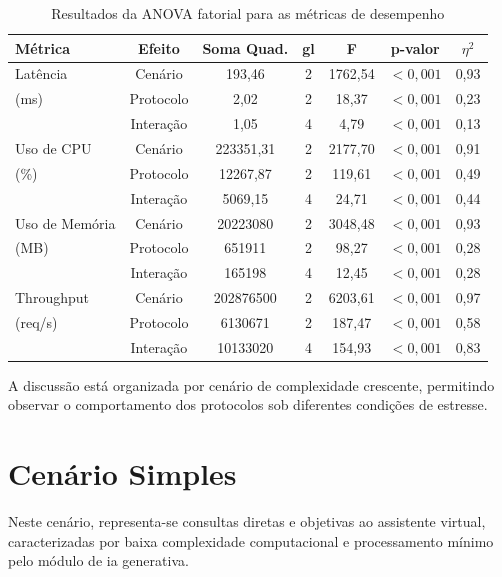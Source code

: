 \begin{table}[h]
\centering
\caption{Resultados da ANOVA fatorial para as métricas de desempenho}
\label{tab:5-resultados-anova}
\begin{tabular}{lcccccc}
\hline
\textbf{Métrica} & \textbf{Efeito} & \textbf{Soma Quad}. & \textbf{gl} & \textbf{F} & \textbf{p-valor} & \textbf{$\eta^2$} \\ 
\hline
Latência & Cenário & 193,46 & 2 & 1762,54 & $< 0,001$ & 0,93 \\
(ms) & Protocolo & 2,02 & 2 & 18,37 &$< 0,001$ & 0,23 \\
& Interação & 1,05 & 4 & 4,79 & $< 0,001$ & 0,13 \\
\hline
Uso de CPU & Cenário & 223351,31 & 2 & 2177,70 & $< 0,001$ & 0,91 \\
(\%) & Protocolo & 12267,87 & 2 & 119,61 & $< 0,001$ & 0,49 \\
& Interação & 5069,15 & 4 & 24,71 & $< 0,001$ & 0,44 \\
\hline
Uso de Memória & Cenário & 20223080 & 2 & 3048,48 & $< 0,001$ & 0,93 \\
(MB) & Protocolo & 651911 & 2 & 98,27 & $< 0,001$ & 0,28 \\
& Interação & 165198 & 4 & 12,45 & $< 0,001$ & 0,28 \\
\hline
Throughput & Cenário & 202876500 & 2 & 6203,61 & $< 0,001$ & 0,97 \\
(req/s) & Protocolo & 6130671 & 2 & 187,47 & $< 0,001$ & 0,58 \\
& Interação & 10133020 & 4 & 154,93 & $< 0,001$ & 0,83 \\
\hline
\end{tabular}
\end{table}

A discussão está organizada por cenário de complexidade crescente, permitindo observar o comportamento dos protocolos sob diferentes condições de estresse.

\section{Cenário Simples}
\label{sec:cenario_simples}

Neste cenário, representa-se consultas diretas e objetivas ao assistente virtual, caracterizadas por baixa complexidade computacional e processamento mínimo pelo módulo de \acrfull{ia} generativa.

